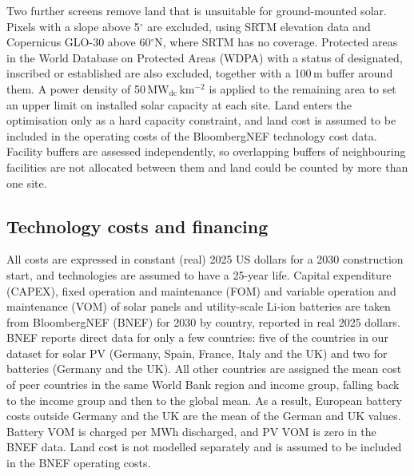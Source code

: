 \documentclass[11pt]{article}
\begin{document}
Two further screens remove land that is unsuitable for ground-mounted solar. Pixels with a slope above 5$^\circ$ are excluded, using SRTM elevation data and Copernicus GLO-30 above 60$^\circ$N, where SRTM has no coverage. Protected areas in the World Database on Protected Areas (WDPA)\cite{wdpa} with a status of designated, inscribed or established are also excluded, together with a 100\,m buffer around them. A power density of 50\,MW$_{\mathrm{dc}}$\,km$^{-2}$ is applied to the remaining area to set an upper limit on installed solar capacity at each site. Land enters the optimisation only as a hard capacity constraint, and land cost is assumed to be included in the operating costs of the BloombergNEF technology cost data\cite{bnef2024lcoe}. Facility buffers are assessed independently, so overlapping buffers of neighbouring facilities are not allocated between them and land could be counted by more than one site.

\subsection*{Technology costs and financing}
All costs are expressed in constant (real) 2025 US dollars for a 2030 construction start, and technologies are assumed to have a 25-year life. Capital expenditure (CAPEX), fixed operation and maintenance (FOM) and variable operation and maintenance (VOM) of solar panels and utility-scale Li-ion batteries are taken from BloombergNEF (BNEF)\cite{bnef2024lcoe} for 2030 by country, reported in real 2025 dollars. BNEF reports direct data for only a few countries: five of the countries in our dataset for solar PV (Germany, Spain, France, Italy and the UK) and two for batteries (Germany and the UK). All other countries are assigned the mean cost of peer countries in the same World Bank region and income group, falling back to the income group and then to the global mean. As a result, European battery costs outside Germany and the UK are the mean of the German and UK values. Battery VOM is charged per MWh discharged, and PV VOM is zero in the BNEF data. Land cost is not modelled separately and is assumed to be included in the BNEF operating costs.
\end{document}
